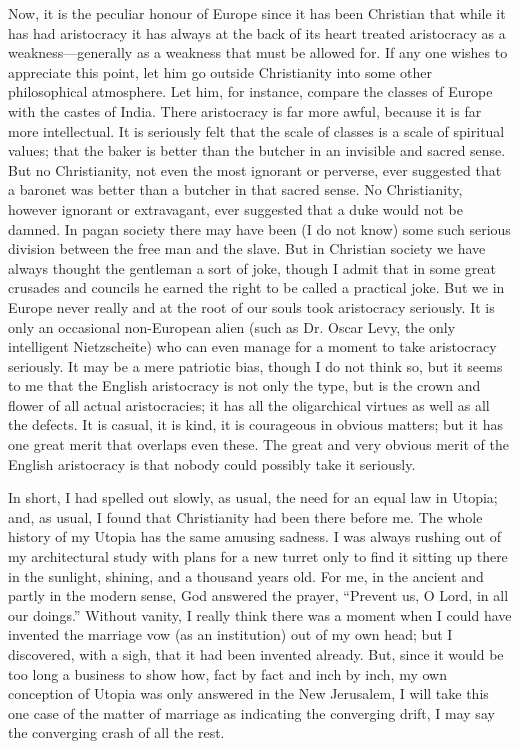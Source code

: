 Now, it is the peculiar honour of Europe since it has been Christian that while it has had aristocracy it has always at the back of its heart treated aristocracy as a weakness—generally as a weakness that must be allowed for. If any one wishes to appreciate this point, let him go outside Christianity into some other philosophical atmosphere. Let him, for instance, compare the classes of Europe with the castes of India. There aristocracy is far more awful, because it is far more intellectual. It is seriously felt that the scale of classes is a scale of spiritual values; that the baker is better than the butcher in an invisible and sacred sense. But no Christianity, not even the most ignorant or perverse, ever suggested that a baronet was better than a butcher in that sacred sense. No Christianity, however ignorant or extravagant, ever suggested that a duke would not be damned. In pagan society there may have been (I do not know) some such serious division between the free man and the slave. But in Christian society we have always thought the gentleman a sort of joke, though I admit that in some great crusades and councils he earned the right to be called a practical joke. But we in Europe never really and at the root of our souls took aristocracy seriously. It is only an occasional non-European alien (such as Dr. Oscar Levy, the only intelligent Nietzscheite) who can even manage for a moment to take aristocracy seriously. It may be a mere patriotic bias, though I do not think so, but it seems to me that the English aristocracy is not only the type, but is the crown and flower of all actual aristocracies; it has all the oligarchical virtues as well as all the defects. It is casual, it is kind, it is courageous in obvious matters; but it has one great merit that overlaps even these. The great and very obvious merit of the English aristocracy is that nobody could possibly take it seriously.

In short, I had spelled out slowly, as usual, the need for an equal law in Utopia; and, as usual, I found that Christianity had been there before me. The whole history of my Utopia has the same amusing sadness. I was always rushing out of my architectural study with plans for a new turret only to find it sitting up there in the sunlight, shining, and a thousand years old. For me, in the ancient and partly in the modern sense, God answered the prayer, “Prevent us, O Lord, in all our doings.” Without vanity, I really think there was a moment when I could have invented the marriage vow (as an institution) out of my own head; but I discovered, with a sigh, that it had been invented already. But, since it would be too long a business to show how, fact by fact and inch by inch, my own conception of Utopia was only answered in the New Jerusalem, I will take this one case of the matter of marriage as indicating the converging drift, I may say the converging crash of all the rest.

